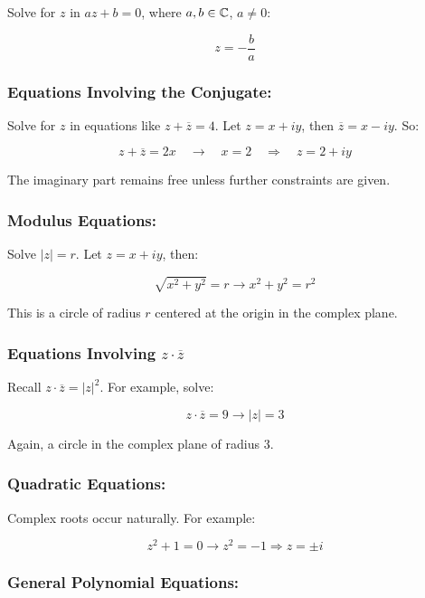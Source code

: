 Solve for \(z\) in \( az + b = 0 \), where \( a, b \in \mathbb{C} \), \( a \neq 0 \):
	
\[
	z = -\frac{b}{a}
\]

\subsubsection{Equations Involving the Conjugate:}

Solve for \(z\) in equations like \( z + \overline{z} = 4 \).
Let \( z = x + iy \), then \( \overline{z} = x - iy \). So:
	      
\[
	z + \overline{z} = 2x \quad \to \quad x = 2 \quad \Rightarrow \quad z = 2 + iy
\]
	      
The imaginary part remains free unless further constraints are given.

\subsubsection{Modulus Equations:}

Solve \( |z| = r \). Let \( z = x + iy \), then:
	      
\[
	\sqrt{x^2 + y^2} = r \to x^2 + y^2 = r^2
\]

This is a circle of radius \( r \) centered at the origin in the complex plane.

\subsubsection{Equations Involving \texorpdfstring{\( z \cdot \overline{z} \)}{}}

Recall \( z \cdot \overline{z} = |z|^2 \). For example, solve:
	      
\[
	z \cdot \overline{z} = 9 \to |z| = 3
\]

Again, a circle in the complex plane of radius 3.

\subsubsection{Quadratic Equations:}

Complex roots occur naturally. For example:

\[
	z^2 + 1 = 0 \to z^2 = -1 \Rightarrow z = \pm i
\]

\subsubsection{General Polynomial Equations:}

